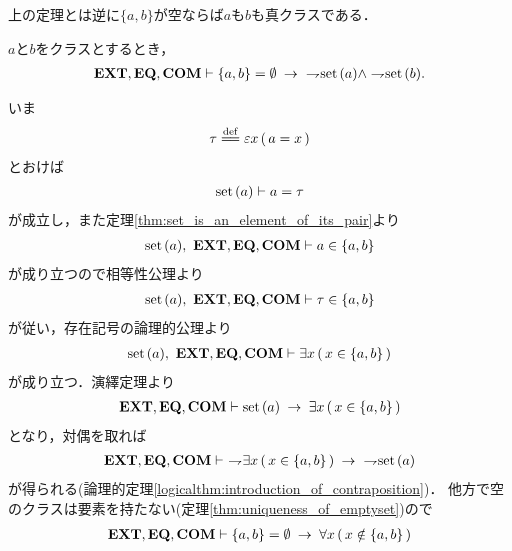 	上の定理とは逆に$\{a,b\}$が空ならば$a$も$b$も真クラスである．
	
	\begin{screen}
		\begin{thm}[空な対に表示されているクラスは集合ではない]
		\label{thm:classes_displayed_in_empty_pair_are_not_sets}
			$a$と$b$をクラスとするとき，
			\begin{align}
				\EXTAX,\EQAX,\COMAX \vdash \{a,b\} = \emptyset \rarrow\ \negation \set{a} \wedge \negation \set{b}.
			\end{align}
		\end{thm}
	\end{screen}
	
	\begin{sketch}
		いま
		\begin{align}
			\tau \defeq \varepsilon x\, (\, a = x\, )
		\end{align}
		とおけば
		\begin{align}
			\operatorname*{set}\hspace{0.15em}(a) \vdash a = \tau
		\end{align}
		が成立し，また定理\ref{thm:set_is_an_element_of_its_pair}より
		\begin{align}
			\operatorname*{set}\hspace{0.15em}(a),\ \mbox{{\bf EXT}},\mbox{{\bf EQ}},\mbox{\bf COM} \vdash a \in \{a,b\}
		\end{align}
		が成り立つので相等性公理より
		\begin{align}
			\operatorname*{set}\hspace{0.15em}(a),\ \mbox{{\bf EXT}},\mbox{{\bf EQ}},\mbox{\bf COM} \vdash \tau \in \{a,b\}
		\end{align}
		が従い，存在記号の論理的公理より
		\begin{align}
			\operatorname*{set}\hspace{0.15em}(a),\ \mbox{{\bf EXT}},\mbox{{\bf EQ}},\mbox{\bf COM} \vdash \exists x\, (\, x \in \{a,b\}\, )
		\end{align}
		が成り立つ．演繹定理より
		\begin{align}
			\mbox{{\bf EXT}},\mbox{{\bf EQ}},\mbox{\bf COM} \vdash \operatorname*{set}\hspace{0.15em}(a) \hspace{0.25em}\rightarrow\hspace{0.25em} \exists x\, (\, x \in \{a,b\}\, )
		\end{align}
		となり，対偶を取れば
		\begin{align}
			\mbox{{\bf EXT}},\mbox{{\bf EQ}},\mbox{\bf COM} \vdash\ \rightharpoondown\hspace{-0.25em} \exists x\, (\, x \in \{a,b\}\, )
			\hspace{0.25em}\rightarrow\hspace{0.25em}\ \rightharpoondown\hspace{-0.25em} \operatorname*{set}\hspace{0.15em}(a)
			\label{fom:classes_displayed_in_empty_pair_are_not_sets_1}
		\end{align}
		が得られる(論理的定理\ref{logicalthm:introduction_of_contraposition})．
		他方で空のクラスは要素を持たない(定理\ref{thm:uniqueness_of_emptyset})ので
		\begin{align}
			\EXTAX,\EQAX,\COMAX \vdash \{a,b\} = \emptyset \rarrow \forall x\, (\, x \notin \{a,b\}\, )
			\label{fom:classes_displayed_in_empty_pair_are_not_sets_2}

\end{align}
\end{sketch}
